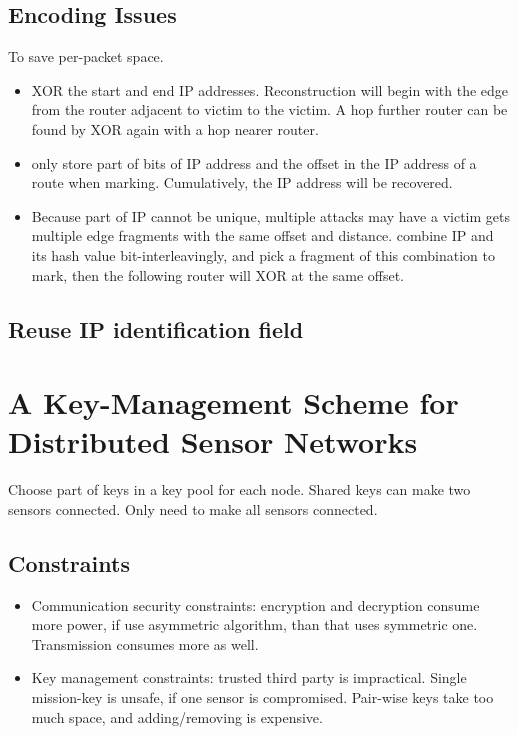 \documentclass[]{article}
\begin{document}
\subsection{Encoding Issues}
To save per-packet space.
\begin{itemize}
 \item XOR the start and end IP addresses. Reconstruction will begin
 with the edge from the router adjacent to victim to the victim. A hop
 further router can be found by XOR again with a hop nearer router.
 \item only store part of bits of IP address and the offset in the IP address 
 of a route when marking. Cumulatively, the IP address will be recovered.
 \item Because part of IP cannot be unique, multiple attacks may have 
 a victim gets multiple edge fragments with the same offset and distance.
 combine IP and its hash value bit-interleavingly, and pick a fragment of
 this combination to mark, then the following router will XOR at the same 
 offset. 
\end{itemize}

\subsection{Reuse IP identification field}

\section{A Key-Management Scheme for Distributed Sensor Networks}
Choose part of keys in a key pool for each node. Shared keys can make
two sensors connected. Only need to make all sensors connected.

\subsection{Constraints}
\begin{itemize}
 \item Communication security constraints: encryption and decryption
 consume more power, if use asymmetric algorithm, than that uses 
 symmetric one. Transmission consumes more as well.
  \item Key management constraints: trusted third party is impractical.
  Single mission-key is unsafe, if one sensor is compromised. Pair-wise
  keys take too much space, and adding/removing is expensive. 
\end{itemize}
\end{document}
